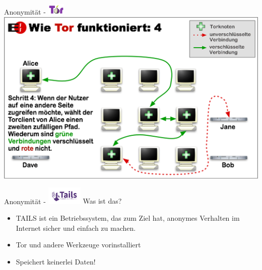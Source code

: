 \documentclass{beamer}
\begin{document}
\begin{frame}{Anonymität - \includegraphics[align=c,height=1.5em]{tor.jpg}}
    \centering\includegraphics[height=0.7\textheight]{tor4.png}
\end{frame}

\begin{frame}{Anonymität - \includegraphics[align=c,height=2.3em]{tails.png}}
	Was ist das?
	\begin{itemize}
		\item TAILS ist ein Betriebssystem, das zum Ziel hat, anonymes Verhalten im Internet sicher und einfach zu machen.
		\item Tor und andere Werkzeuge vorinstalliert
                \item Speichert keinerlei Daten!
	\end{itemize}
\end{frame}
\end{document}
